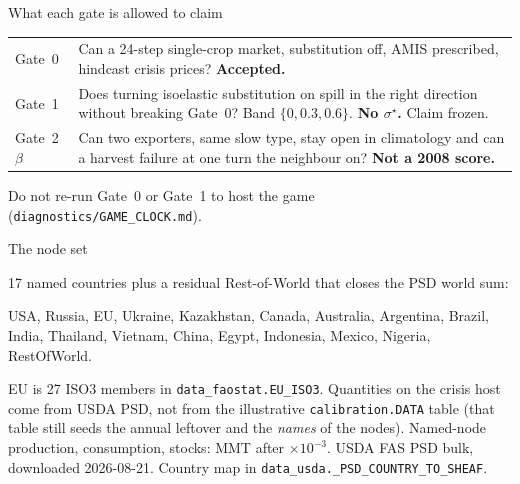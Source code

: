 \begin{frame}{What each gate is allowed to claim}
{\scriptsize
\renewcommand{\arraystretch}{1.05}
\begin{tabular}{@{}lp{}@{}}
\toprule
Gate~0 & Can a 24-step single-crop market, substitution off, AMIS prescribed,
         hindcast crisis prices? \textbf{Accepted.} \\
Gate~1 & Does turning isoelastic substitution on spill in the right
         direction without breaking Gate~0? Band $\{0,0.3,0.6\}$.
         \textbf{No $\sigma^\star$.} Claim frozen. \\
Gate~2 $\beta$ & Can two exporters, same slow type, stay open in climatology
         and can a harvest failure at one turn the neighbour on?
         \textbf{Not a 2008 score.} \\
\bottomrule
\end{tabular}}

\vspace{0.4em}
{\scriptsize Do not re-run Gate~0 or Gate~1 to host the game
(\texttt{diagnostics/GAME\_CLOCK.md}).}
\end{frame}

\begin{frame}{The node set}

17 named countries plus a residual Rest-of-World that closes the PSD world
sum:

USA, Russia, EU, Ukraine, Kazakhstan, Canada, Australia, Argentina,
Brazil, India, Thailand, Vietnam, China, Egypt, Indonesia, Mexico, Nigeria,
RestOfWorld.

EU is 27 ISO3 members in \texttt{data\_faostat.EU\_ISO3}. Quantities on the
crisis host come from USDA PSD, not from the illustrative
\texttt{calibration.DATA} table (that table still seeds the annual leftover
and the \emph{names} of the nodes).
{Named-node production, consumption, stocks: MMT after $\times 10^{-3}$.}
{USDA FAS PSD bulk, downloaded 2026-08-21. Country map in
\texttt{data\_usda.\_PSD\_COUNTRY\_TO\_SHEAF}.}
\end{frame}
